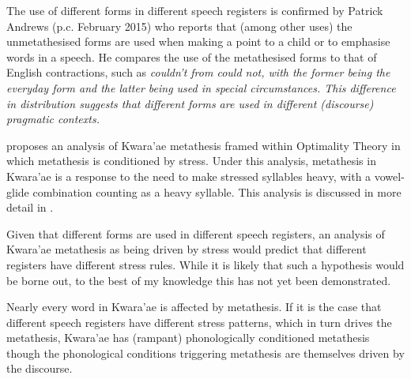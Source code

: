 The use of different forms in different speech registers is confirmed by Patrick Andrews
(p.c. February 2015)
who reports that (among other uses) the unmetathesised forms
are used when making a point to a child or to emphasise words in a speech.
He compares the use of the metathesised forms to that of English contractions,
such as \it{couldn't} from \it{could not},
with the former being the everyday form and the latter being used in special circumstances.
This difference in distribution suggests that different forms
are used in different (discourse) pragmatic contexts.

\cite{he04} proposes an analysis of Kwara'ae metathesis framed within Optimality Theory
in which metathesis is conditioned by stress.
Under this analysis, metathesis in Kwara'ae is a response
to the need to make stressed syllables heavy,
with a vowel-glide combination counting as a heavy syllable.
This analysis is discussed in more detail in .

Given that different forms are used in different speech registers,
an analysis of Kwara'ae metathesis as being driven by stress
would predict that different registers have different stress rules.
While it is likely that such a hypothesis would be borne out,
to the best of my knowledge this has not yet been demonstrated.

Nearly every word in Kwara'ae is affected by metathesis.
If it is the case that different speech registers have
different stress patterns, which in turn drives the metathesis,
Kwara'ae has (rampant) phonologically conditioned metathesis
though the phonological conditions triggering metathesis
are themselves driven by the discourse.